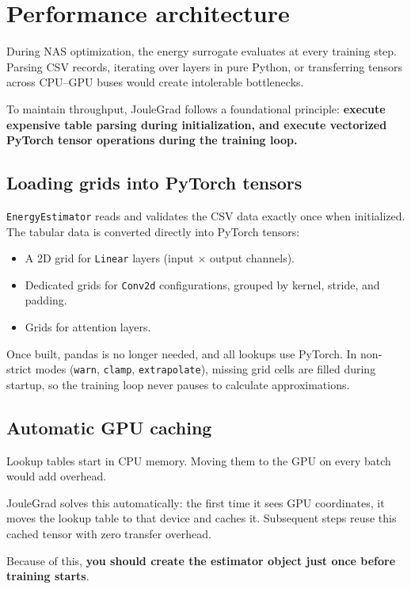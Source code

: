 \section{Performance architecture}

During NAS optimization, the energy surrogate evaluates at every training step. Parsing CSV records, iterating over layers in pure Python, or transferring tensors across CPU--GPU buses would create intolerable bottlenecks.

To maintain throughput, JouleGrad follows a foundational principle: \textbf{execute expensive table parsing during initialization, and execute vectorized PyTorch tensor operations during the training loop.}

\subsection{Loading grids into PyTorch tensors}

\texttt{EnergyEstimator} reads and validates the CSV data exactly once when initialized. The tabular data is converted directly into PyTorch tensors:
\begin{itemize}
    \item A 2D grid for \texttt{Linear} layers (input $\times$ output channels).
    \item Dedicated grids for \texttt{Conv2d} configurations, grouped by kernel, stride, and padding.
    \item Grids for attention layers.
\end{itemize}
Once built, pandas is no longer needed, and all lookups use PyTorch. In non-strict modes (\texttt{warn}, \texttt{clamp}, \texttt{extrapolate}), missing grid cells are filled during startup, so the training loop never pauses to calculate approximations.

\subsection{Automatic GPU caching}

Lookup tables start in CPU memory. Moving them to the GPU on every batch would add overhead. 

JouleGrad solves this automatically: the first time it sees GPU coordinates, it moves the lookup table to that device and caches it. Subsequent steps reuse this cached tensor with zero transfer overhead. 

Because of this, \textbf{you should create the estimator object just once before training starts}. 

